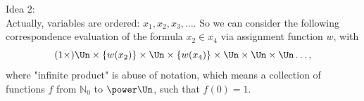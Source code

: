 Idea 2:\\

Actually, variables are ordered: $x_1,x_2,x_3,\dots$.
So we can consider the following correspondence evaluation of the formula $x_2\in x_4$ via assignment function $w$, with 
\[
(1\times)\Un\times \{w(x_2)\}\times\Un\times\{w(x_4)\}\times\Un\times\Un\times\Un\dots,
\]
where "infinite product" is abuse of notation, which means a collection of functions $f$ from $\mathbb{N}_0$ to $\power\Un$, such that $f(0)=1$. %

